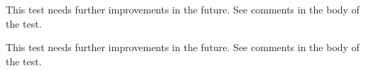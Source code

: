 \begin{DoxyRefList}
\item[Subprogram \mbox{\hyperlink{namespaceTest__System__mod_ada729e6f3789a1df730ac21f58d5a334}{Test\+\_\+\+System\+\_\+mod\+::test\+\_\+\+OS\+\_\+type\+\_\+3}} ()]\label{todo__todo000037}%
%
 This test needs further improvements in the future. See comments in the body of the test.  
\item[Subprogram \mbox{\hyperlink{namespaceTest__System__mod_a6ba8a4348e2457b775dd061d40f33cb8}{Test\+\_\+\+System\+\_\+mod\+::test\+\_\+\+Sys\+Cmd\+\_\+type\+\_\+1}} ()]\label{todo__todo000038}%
%
 This test needs further improvements in the future. See comments in the body of the test. 
\end{DoxyRefList}